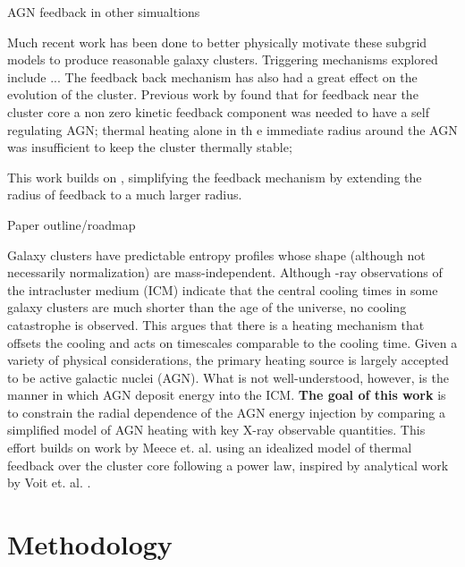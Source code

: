 \documentclass[iop,apjl, twocolappendix]{emulateapj}   %
\def\FG#1{{\textcolor{ForestGreen}{\textbf{\textit{ FG: #1}}}}}
\begin{document}
\textbullet AGN feedback in other simualtions

Much recent work has been done to better physically motivate these subgrid
models to produce reasonable galaxy clusters. Triggering mechanisms explored
include ... The feedback back mechanism has also had a great effect on the
evolution of the cluster. Previous work by \cite{meece_jr_agn_2016} found that
for feedback near the cluster core a non zero kinetic feedback component was
needed to have a self regulating AGN; thermal heating alone in th e immediate
radius around the AGN was insufficient to keep the cluster thermally stable;

\textbullet \FG{Elaborate on Greg's work?}

This work  builds on \cite{meece_jr_agn_2016}, simplifying the feedback
mechanism by extending the radius of feedback to a much larger radius.


\textbullet Paper outline/roadmap

Galaxy clusters have predictable entropy profiles whose shape (although not
necessarily normalization) are mass-independent.
\cite{cavagnolo_intracluster_2009} Although -ray observations of the
intracluster medium (ICM) indicate that the central cooling times  in some
galaxy clusters are much shorter than the age of the universe, no cooling
catastrophe is observed. This argues that there is a heating mechanism that
offsets the cooling and acts on timescales comparable to the cooling time.
Given a variety of physical considerations, the primary heating source is
largely accepted to be active galactic nuclei (AGN).  What is not
well-understood, however, is the manner in which AGN deposit energy into the
ICM.   \textbf{The goal of this work} is to constrain the radial dependence of
the AGN energy injection by comparing a simplified model of AGN heating with
key X-ray observable quantities. This effort builds on work by Meece et. al.
\cite{meece_jr_agn_2016,meece_triggering_2017} using an idealized model of
thermal feedback over the cluster core following a power law, inspired by
analytical work by Voit et. al.
\cite{voit_global_2017}.

\section{Methodology}
\label{sec:methodology}
\end{document}
